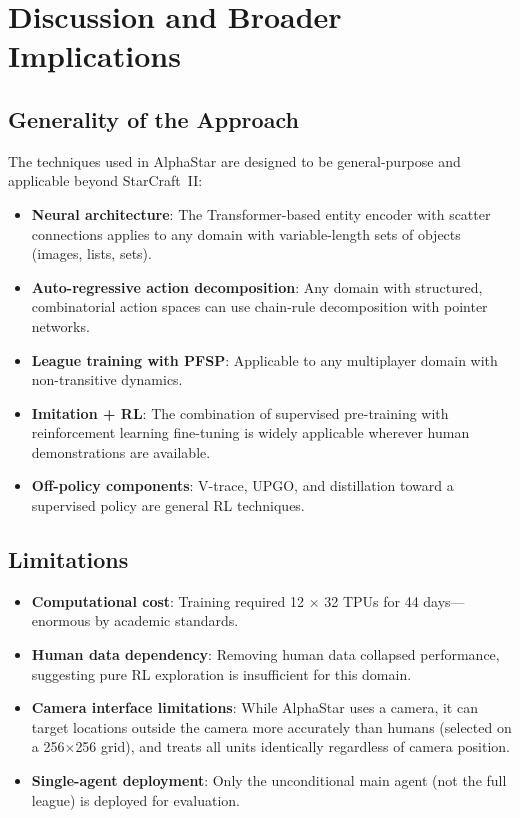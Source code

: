 \documentclass[11pt,a4paper]{article}
\begin{document}
\section{Discussion and Broader Implications}

\subsection{Generality of the Approach}

The techniques used in AlphaStar are designed to be general-purpose and applicable beyond StarCraft~II:

\begin{itemize}[nosep]
    \item \textbf{Neural architecture}: The Transformer-based entity encoder with scatter connections applies to any domain with variable-length sets of objects (images, lists, sets).
    \item \textbf{Auto-regressive action decomposition}: Any domain with structured, combinatorial action spaces can use chain-rule decomposition with pointer networks.
    \item \textbf{League training with PFSP}: Applicable to any multiplayer domain with non-transitive dynamics.
    \item \textbf{Imitation + RL}: The combination of supervised pre-training with reinforcement learning fine-tuning is widely applicable wherever human demonstrations are available.
    \item \textbf{Off-policy components}: V-trace, UPGO, and distillation toward a supervised policy are general RL techniques.
\end{itemize}

\subsection{Limitations}

\begin{itemize}[nosep]
    \item \textbf{Computational cost}: Training required 12 $\times$ 32 TPUs for 44 days---enormous by academic standards.
    \item \textbf{Human data dependency}: Removing human data collapsed performance, suggesting pure RL exploration is insufficient for this domain.
    \item \textbf{Camera interface limitations}: While AlphaStar uses a camera, it can target locations outside the camera more accurately than humans (selected on a 256$\times$256 grid), and treats all units identically regardless of camera position.
    \item \textbf{Single-agent deployment}: Only the unconditional main agent (not the full league) is deployed for evaluation.
\end{itemize}
\end{document}
